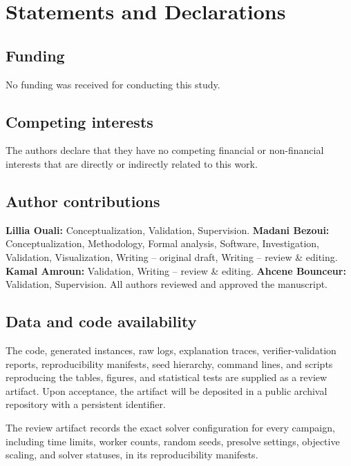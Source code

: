 \documentclass[pdflatex,sn-mathphys-num,iicol,oneside]{sn-jnl}
\begin{document}
\section*{Statements and Declarations}

\subsection*{Funding}

No funding was received for conducting this study.

\subsection*{Competing interests}

The authors declare that they have no competing financial or
non-financial interests that are directly or indirectly related to
this work.

\subsection*{Author contributions}

\textbf{Lillia Ouali:} Conceptualization, Validation, Supervision. \textbf{Madani Bezoui:} Conceptualization, Methodology, Formal analysis, Software, Investigation, Validation, Visualization, Writing -- original draft, Writing -- review \& editing. \textbf{Kamal Amroun:} Validation, Writing -- review \& editing. \textbf{Ahcene Bounceur:} Validation, Supervision. All authors reviewed and approved the manuscript.

\subsection*{Data and code availability}

The code, generated instances, raw logs, explanation traces,
verifier-validation reports, reproducibility manifests, seed
hierarchy, command lines, and scripts reproducing the tables, figures,
and statistical tests are supplied as a review artifact. Upon
acceptance, the artifact will be deposited in a public archival
repository with a persistent identifier.

The review artifact records the exact solver configuration for every
campaign, including time limits, worker counts, random seeds,
presolve settings, objective scaling, and solver statuses, in its
reproducibility manifests.
\end{document}
